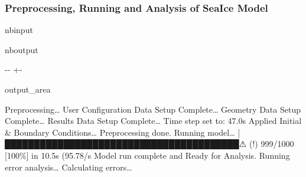 \documentclass[a4paper,11pt,english,openany]{sphinxmanual}
\begin{document}
\subsubsection{Preprocessing, Running and Analysis of Sea\sphinxhyphen{}Ice Model}
\label{\detokenize{quick_start/example/main_original:Preprocessing,-Running-and-Analysis-of-Sea-Ice-Model}}
\begin{sphinxuseclass}{nbinput}
{
\begin{sphinxVerbatim}[commandchars=\\\{\}]
\llap{\color{nbsphinxin}[3]:\,\hspace{\fboxrule}\hspace{\fboxsep}}    
   
  
     
\end{sphinxVerbatim}
}

\end{sphinxuseclass}
\begin{sphinxuseclass}{nboutput}
{

\kern-\sphinxverbatimsmallskipamount\kern-\baselineskip
\kern+\FrameHeightAdjust\kern-\fboxrule
\vspace{\nbsphinxcodecellspacing}

\begin{sphinxuseclass}{output_area}
\begin{sphinxuseclass}{}


\begin{sphinxVerbatim}[commandchars=\\\{\}]
Preprocessing{\ldots}
User Configuration Data Setup Complete{\ldots}
Geometry Data Setup Complete{\ldots}
Results Data Setup Complete{\ldots}
Time step set to: 47.0s
Applied Initial \& Boundary Conditions{\ldots}
Preprocessing done.
Running model{\ldots}
|████████████████████████████████████████⚠︎ (!) 999/1000 [100\%] in 10.5s (95.78/s
Model run complete and Ready for Analysis.
Running error analysis{\ldots}
Calculating errors{\ldots}
\end{sphinxVerbatim}



\end{sphinxuseclass}
\end{sphinxuseclass}
}

\end{sphinxuseclass}
\end{document}
